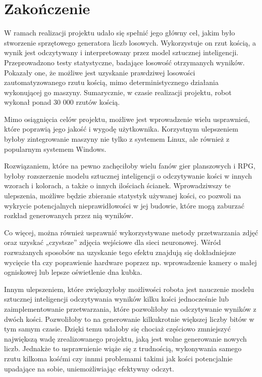 
\chapter{Zakończenie}\label{ch:zakonczenie}

W ramach realizacji projektu udało się spełnić jego główny cel, jakim było stworzenie sprzętowego generatora liczb losowych.
Wykorzystuje on rzut kością, a wynik jest odczytywany i interpretowany przez model sztucznej inteligencji. Przeprowadzono
testy statystyczne, badające losowość otrzymanych wyników. Pokazały one, że możliwe jest uzyskanie prawdziwej losowości 
zautomatyzowanego rzutu kością, mimo deterministycznego działania wykonującej go maszyny. 
Sumarycznie, w czasie realizacji projektu, robot wykonał ponad 30 000 rzutów kością.

Mimo osiągnięcia celów projektu, możliwe jest wprowadzenie wielu usprawnień, które poprawią jego jakość i wygodę użytkownika.
Korzystnym ulepszeniem byłoby zintegrowanie maszyny nie tylko z systemem Linux, ale również z popularnym systemem Windows.

Rozwiązaniem, które na pewno zachęciłoby wielu fanów gier planszowych i RPG, byłoby rozszerzenie modelu 
sztucznej inteligencji o odczytywanie kości w innych wzorach i kolorach, a także o innych ilościach ścianek.
Wprowadziwszy te ulepszenia, możliwe będzie zbieranie statystyk używanej kości, co pozwoli na wykrycie
potencjalnych nieprawidłowości w jej budowie, które mogą zaburzać rozkład generowanych przez nią wyników.

Co więcej, można również usprawnić wykorzystywane metody przetwarzania zdjęć oraz uzyskać
„czystsze” zdjęcia wejściowe dla sieci neuronowej. Wśród rozważanych sposobów na uzyskanie tego efektu znajdują się
dokładniejsze wycięcie tła czy poprawienie hardware poprzez np. wprowadzenie kamery o małej ogniskowej lub
lepsze oświetlenie dna kubka.

Innym ulepszeniem, które zwiększyłoby możliwości robota jest nauczenie modelu sztucznej inteligencji odczytywania
wyników kilku kości jednocześnie lub zaimplementowanie przetwarzania, które pozwoliłoby na odczytywanie wyników z dwóch kości.
Pozwoliłoby to na generowanie kilkukrotnie większej liczby bitów w tym samym czasie.
Dzięki temu udałoby się chociaż częściowo zmniejszyć największą wadę zrealizowanego projektu,
jaką jest wolne generowanie nowych liczb.
Jednakże to usprawnienie wiąże się z trudnością, wykonywania samego rzutu kilkoma kośćmi czy innmi problemami takimi jak kości potencjalnie 
upadające na sobie, uniemożliwiając efektywny odczyt.

